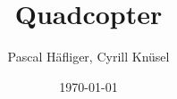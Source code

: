 \title{Quadcopter}  
\author{Pascal Häfliger, Cyrill Knüsel}
\date{\today} 

\begin{frame}
\titlepage
\end{frame} 